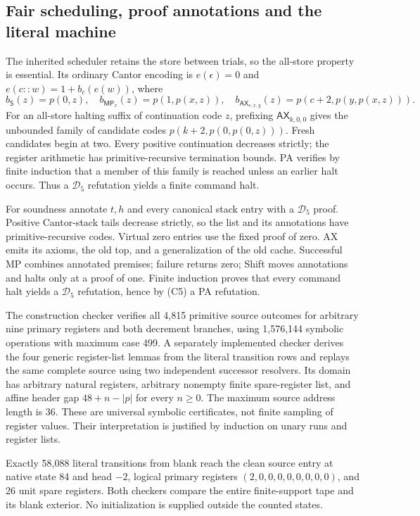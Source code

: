 \subsection{Fair scheduling, proof annotations and the literal machine}

The inherited scheduler retains the store between trials, so the all-store
property is essential. Its ordinary Cantor encoding is $e(\epsilon)=0$
and $e(c::w)=1+b_c(e(w))$, where
\[
 b_{\mathsf S}(z)=p(0,z),\quad
 b_{\mathsf{MP}_x}(z)=p(1,p(x,z)),\quad
 b_{\mathsf{AX}_{c,x,y}}(z)=p(c+2,p(y,p(x,z))).
\]
For an all-store halting suffix of continuation code $z$, prefixing
$\mathsf{AX}_{k,0,0}$ gives the unbounded family of candidate codes
$p(k+2,p(0,p(0,z)))$. Fresh candidates begin at two. Every positive
continuation decreases strictly; the register arithmetic has
primitive-recursive termination bounds. PA verifies by finite induction
that a member of this family is reached unless an earlier halt occurs.
Thus a $\mathcal D_5$ refutation yields a finite command halt.

For soundness annotate $t,h$ and every canonical stack entry with a
$\mathcal D_5$ proof. Positive Cantor-stack tails decrease strictly, so
the list and its annotations have primitive-recursive codes. Virtual
zero entries use the fixed proof of zero. AX emits its axioms, the old
top, and a generalization of the old cache. Successful MP combines
annotated premises; failure returns zero; Shift moves annotations and
halts only at a proof of one. Finite induction proves that every command
halt yields a $\mathcal D_5$ refutation, hence by (C5) a PA refutation.

The construction checker verifies all 4,815 primitive source outcomes
for arbitrary nine primary registers and both decrement branches, using
1,576,144 symbolic operations with maximum case 499. A separately
implemented checker derives the four generic register-list lemmas from
the literal transition rows and replays the same complete source using
two independent successor resolvers. Its domain has arbitrary natural
registers, arbitrary nonempty finite spare-register list, and affine
header gap $48+n-|p|$ for every $n\geq0$. The maximum source address
length is 36. These are universal symbolic certificates, not finite
sampling of register values. Their interpretation is justified by
induction on unary runs and register lists.

Exactly 58,088 literal transitions from blank reach the clean source
entry at native state 84 and head $-2$, logical primary registers
$(2,0,0,0,0,0,0,0,0)$, and 26 unit spare registers. Both checkers compare
the entire finite-support tape and its blank exterior. No initialization
is supplied outside the counted states.

